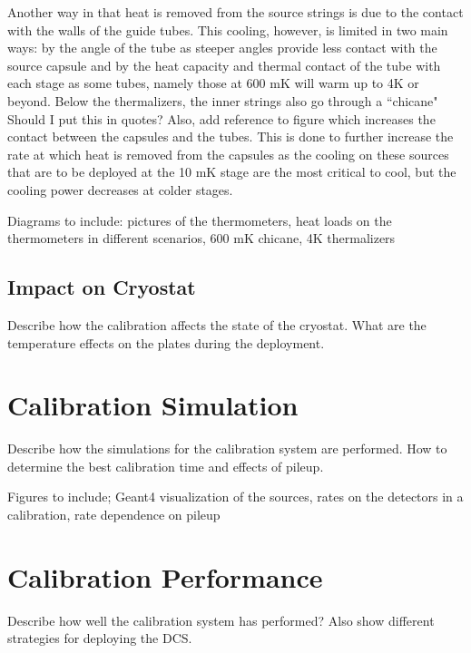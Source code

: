 Another way in that heat is removed from the source strings is due to the contact with the walls of the guide tubes. This cooling, however, is limited in two main ways: by the angle of the tube as steeper angles provide less contact with the source capsule and by the heat capacity and thermal contact of the tube with each stage as some tubes, namely those at 600 mK will warm up to 4K or beyond. Below the thermalizers, the inner strings also go through a ``chicane" \color{red} Should I put this in quotes? Also, add reference to figure\color{black} which increases the contact between the capsules and the tubes. This is done to further increase the rate at which heat is removed from the capsules as the cooling on these sources that are to be deployed at the 10 mK stage are the most critical to cool, but the cooling power decreases at colder stages. 

Diagrams to include: pictures of the thermometers, heat loads on the thermometers in different scenarios, 600 mK chicane, 4K thermalizers
\subsection{Impact on Cryostat}

Describe how the calibration affects the state of the cryostat. What are the temperature effects on the plates during the deployment.


\section{Calibration Simulation}
Describe how the simulations for the calibration system are performed. How to determine the best calibration time and effects of pileup.

Figures to include; Geant4 visualization of the sources, rates on the detectors in a calibration, rate dependence on pileup 

\section{Calibration Performance}

Describe how well the calibration system has performed? Also show different strategies for deploying the DCS.